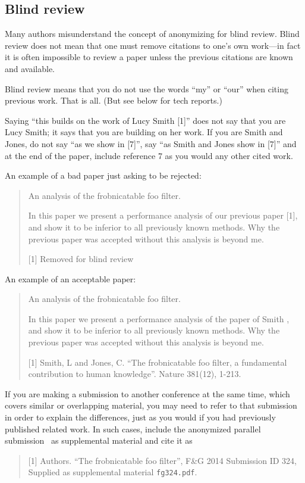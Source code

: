 \subsection{Blind review}

Many authors misunderstand the concept of anonymizing for blind review.
Blind review does not mean that one must remove citations to one's own work---in fact it is often impossible to review a paper unless the previous citations are known and available.

Blind review means that you do not use the words ``my'' or ``our'' when citing previous work.
That is all.
(But see below for tech reports.)

Saying ``this builds on the work of Lucy Smith [1]'' does not say that you are Lucy Smith;
it says that you are building on her work.
If you are Smith and Jones, do not say ``as we show in [7]'', say ``as Smith and Jones show in [7]'' and at the end of the paper, include reference 7 as you would any other cited work.

An example of a bad paper just asking to be rejected:
\begin{quote}
\begin{center}
    An analysis of the frobnicatable foo filter.
\end{center}

   In this paper we present a performance analysis of our previous paper [1], and show it to be inferior to all previously known methods.
   Why the previous paper was accepted without this analysis is beyond me.

   [1] Removed for blind review
\end{quote}


An example of an acceptable paper:
\begin{quote}
\begin{center}
     An analysis of the frobnicatable foo filter.
\end{center}

   In this paper we present a performance analysis of the  paper of Smith \etal [1], and show it to be inferior to all previously known methods.
   Why the previous paper was accepted without this analysis is beyond me.

   [1] Smith, L and Jones, C. ``The frobnicatable foo filter, a fundamental contribution to human knowledge''. Nature 381(12), 1-213.
\end{quote}

If you are making a submission to another conference at the same time, which covers similar or overlapping material, you may need to refer to that submission in order to explain the differences, just as you would if you had previously published related work.
In such cases, include the anonymized parallel submission~\cite{Authors14} as supplemental material and cite it as
\begin{quote}
[1] Authors. ``The frobnicatable foo filter'', F\&G 2014 Submission ID 324, Supplied as supplemental material {\tt fg324.pdf}.
\end{quote}

